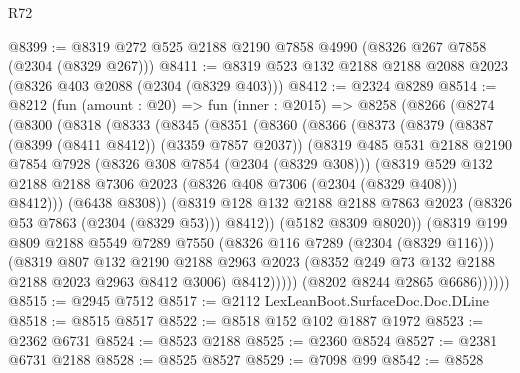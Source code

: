 \begin{lexlean}{R72}
\begin{coremodule}
@8399 := @8319 @272 @525 @2188 @2190 @7858 @4990 (@8326 @267 @7858 (@2304 (@8329 @267)))
@8411 := @8319 @523 @132 @2188 @2188 @2088 @2023 (@8326 @403 @2088 (@2304 (@8329 @403)))
@8412 := @2324 @8289
@8514 := @8212
    (fun (amount : @20) =>
    fun (inner : @2015) =>
    @8258
      (@8266
        (@8274
          (@8300
            (@8318
              (@8333
                (@8345
                  (@8351
                    (@8360
                      (@8366
                        (@8373
                          (@8379
                            (@8387 (@8399 (@8411 @8412)) (@3359 @7857 @2037))
                            (@8319
                              @485
                              @531
                              @2188
                              @2190
                              @7854
                              @7928
                              (@8326 @308 @7854 (@2304 (@8329 @308)))
                              (@8319
                                @529
                                @132
                                @2188
                                @2188
                                @7306
                                @2023
                                (@8326 @408 @7306 (@2304 (@8329 @408)))
                                @8412)))
                          (@6438 @8308))
                        (@8319
                          @128
                          @132
                          @2188
                          @2188
                          @7863
                          @2023
                          (@8326 @53 @7863 (@2304 (@8329 @53)))
                          @8412))
                      (@5182 @8309 @8020))
                    (@8319
                      @199
                      @809
                      @2188
                      @5549
                      @7289
                      @7550
                      (@8326 @116 @7289 (@2304 (@8329 @116)))
                      (@8319
                        @807
                        @132
                        @2190
                        @2188
                        @2963
                        @2023
                        (@8352 @249 @73 @132 @2188 @2188 @2023 @2963 @8412 @3006)
                        @8412)))))
              (@8202 @8244 @2865 @6686))))))
@8515 := @2945 @7512
@8517 := @2112 LexLeanBoot.SurfaceDoc.Doc.DLine
@8518 := @8515 @8517
@8522 := @8518 @152 @102 @1887 @1972
@8523 := @2362 @6731
@8524 := @8523 @2188
@8525 := @2360 @8524
@8527 := @2381 @6731 @2188
@8528 := @8525 @8527
@8529 := @7098 @99
@8542 := @8528

\end{coremodule}
\end{lexlean}
